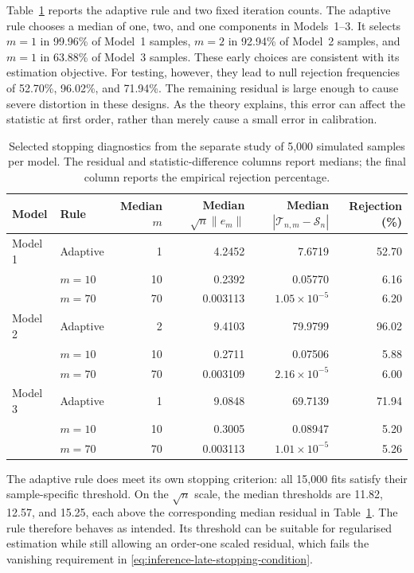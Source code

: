 Table~\ref{tab:inference-stopping-selected} reports the adaptive rule and two
fixed iteration counts.  The adaptive rule chooses a median of one, two,
and one components in Models~1--3.  It selects $m=1$ in 99.96\% of Model~1
samples, $m=2$ in 92.94\% of Model~2 samples, and $m=1$ in 63.88\% of
Model~3 samples.  These early choices are consistent with its estimation
objective.  For testing, however, they lead to null rejection frequencies
of 52.70\%, 96.02\%, and 71.94\%.  The remaining residual is large enough
to cause severe distortion in these designs.  As the theory explains, this
error can affect the statistic at first order, rather than merely cause a
small error in calibration.

\begin{table}[htbp]
    \centering
    \scriptsize
    \caption[Selected stopping diagnostics]{Selected stopping diagnostics from the separate study of 5,000
    simulated samples per model.  The residual and statistic-difference columns report medians;
    the final column reports the empirical rejection percentage.}
    \label{tab:inference-stopping-selected}
    \begin{tabular}{@{}llrrrr@{}}
        \toprule
        Model & Rule & Median $m$ & Median $\sqrt n\|e_m\|$
              & Median $|\mathcal T_{n,m}-\mathcal S_n|$ & Rejection (\%) \\
        \midrule
        Model 1 & Adaptive & 1  & 4.2452 & 7.6719 & 52.70 \\
                & $m=10$   & 10 & 0.2392 & 0.05770 & 6.16 \\
                & $m=70$   & 70 & 0.003113 & $1.05\times10^{-5}$ & 6.20 \\
        \addlinespace
        Model 2 & Adaptive & 2  & 9.4103 & 79.9799 & 96.02 \\
                & $m=10$   & 10 & 0.2711 & 0.07506 & 5.88 \\
                & $m=70$   & 70 & 0.003109 & $2.16\times10^{-5}$ & 6.00 \\
        \addlinespace
        Model 3 & Adaptive & 1  & 9.0848 & 69.7139 & 71.94 \\
                & $m=10$   & 10 & 0.3005 & 0.08947 & 5.20 \\
                & $m=70$   & 70 & 0.003113 & $1.01\times10^{-5}$ & 5.26 \\
        \bottomrule
    \end{tabular}
\end{table}

The adaptive rule does meet its own stopping criterion: all 15,000 fits
satisfy their sample-specific threshold.  On the $\sqrt n$ scale, the
median thresholds are 11.82, 12.57, and 15.25, each above the corresponding
median residual in Table~\ref{tab:inference-stopping-selected}.  The rule
therefore behaves as intended.  Its threshold can be suitable for
regularised estimation while still allowing an order-one scaled residual,
which fails the vanishing requirement in
\eqref{eq:inference-late-stopping-condition}.

